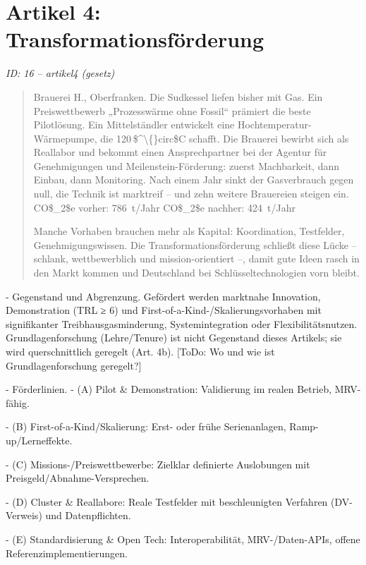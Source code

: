 \documentclass[12pt,a4paper]{scrartcl}
\begin{document}
\section[Artikel 4: Transformationsförderung]{Artikel 4: Transformationsförderung}
\noindent\textit{ID: 16 -- artikel4 (gesetz)}

\begin{quote}
Brauerei H., Oberfranken. Die Sudkessel liefen bisher mit Gas. Ein Preiswettbewerb „Prozesswärme ohne Fossil“ prämiert die beste Pilotlösung. Ein Mittelständler entwickelt eine Hochtemperatur-Wärmepumpe, die 120 \$\textasciicircum{}\textbackslash\{\}circ\$C schafft. Die Brauerei bewirbt sich als Reallabor und bekommt einen Ansprechpartner bei der Agentur für Genehmigungen und Meilenstein-Förderung: zuerst Machbarkeit, dann Einbau, dann Monitoring. Nach einem Jahr sinkt der Gasverbrauch gegen null, die Technik ist marktreif -- und zehn weitere Brauereien steigen ein. CO\$\_2\$e vorher: 786 t/Jahr CO\$\_2\$e nachher: 424 t/Jahr

Manche Vorhaben brauchen mehr als Kapital: Koordination, Testfelder, Genehmigungswissen. Die Transformationsförderung schließt diese Lücke -- schlank, wettbewerblich und mission-orientiert --, damit gute Ideen rasch in den Markt kommen und Deutschland bei Schlüsseltechnologien vorn bleibt.
\end{quote}

- Gegenstand und Abgrenzung. Gefördert werden marktnahe Innovation, Demonstration (TRL ≥ 6) und First-of-a-Kind-/Skalierungsvorhaben mit signifikanter Treibhausgasminderung, Systemintegration oder Flexibilitätsnutzen. Grundlagenforschung (Lehre/Tenure) ist nicht Gegenstand dieses Artikels; sie wird querschnittlich geregelt (Art. 4b). [ToDo: Wo und wie ist Grundlagenforschung geregelt?]

- Förderlinien.
- (A) Pilot \& Demonstration: Validierung im realen Betrieb, MRV-fähig.

- (B) First-of-a-Kind/Skalierung: Erst- oder frühe Serienanlagen, Ramp-up/Lerneffekte.

- (C) Missions-/Preiswettbewerbe: Zielklar definierte Auslobungen mit Preisgeld/Abnahme-Versprechen.

- (D) Cluster \& Reallabore: Reale Testfelder mit beschleunigten Verfahren (DV-Verweis) und Datenpflichten.

- (E) Standardisierung \& Open Tech: Interoperabilität, MRV-/Daten-APIs, offene Referenzimplementierungen.
\end{document}
